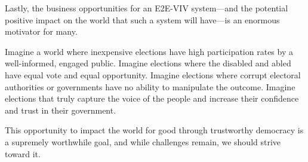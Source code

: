 Lastly, the business opportunities for an E2E-VIV system---and the
potential positive impact on the world that such a system will
have---is an enormous motivator for many. 

Imagine a world where inexpensive elections have high participation
rates by a well-informed, engaged public. Imagine elections where the
disabled and abled have equal vote and equal opportunity. Imagine
elections where corrupt electoral authorities or governments have no
ability to manipulate the outcome. Imagine elections that truly
capture the voice of the people and increase their confidence and
trust in their government. 

This opportunity to impact the world for good through trustworthy
democracy is a supremely worthwhile goal, and while challenges remain,
we should strive toward it.


